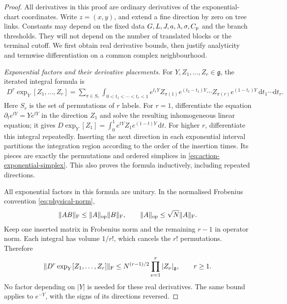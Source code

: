 \documentclass[11pt,reqno]{amsart}
\numberwithin{equation}{section}
\theoremstyle{definition}
\theoremstyle{remark}
\newcommand{\dd}{\mathrm d}
\newcommand{\g}{\mathfrak g}
\begin{document}
\begin{proof}
All derivatives in this proof are ordinary derivatives of the
exponential-chart coordinates. Write \(z=(x,y)\), and extend a
fine direction by zero on tree links. Constants may depend on
the fixed data \(G,L,J,a,\lambda,\sigma,C_{\rm p}\) and the
branch thresholds. They will not depend on the number of
translated blocks or the terminal cutoff. We first obtain real
derivative bounds, then justify analyticity and termwise
differentiation on a common complex neighbourhood.

\smallskip\noindent
\emph{Exponential factors and their derivative placements.}
For \(Y,Z_1,\ldots,Z_r\in\g\), the iterated integral formula is
\begin{equation}
 \begin{split}
 D^r\exp_Y[Z_1,\ldots,Z_r]
  =\sum_{\pi\in S_r}\int_{0<t_1<\cdots<t_r<1}
       e^{t_1Y}Z_{\pi(1)}e^{(t_2-t_1)Y}
          \cdots Z_{\pi(r)}e^{(1-t_r)Y}\,
                                \dd t_1\cdots\dd t_r .
 \end{split}
 \label{eq:action-exponential-simplex}
\end{equation}
Here \(S_r\) is the set of permutations of \(r\) labels.
For \(r=1\), differentiate the equation
\(\partial_t e^{tY}=Ye^{tY}\) in the direction \(Z_1\)
and solve the resulting inhomogeneous linear equation;
it gives \(D\exp_Y[Z_1]=\int_0^1e^{tY}Z_1e^{(1-t)Y}\,\dd t\).
For higher \(r\), differentiate this integral repeatedly.
Inserting the next direction in each exponential interval
partitions the integration region according to the order of
the insertion times. Its pieces are exactly the permutations
and ordered simplices in \eqref{eq:action-exponential-simplex}.
This also proves the formula inductively, including repeated
directions.

All exponential factors in this formula are unitary. In the
normalised Frobenius convention \eqref{eq:physical-norm},
\[
 \|AB\|_{\rm F}\le\|A\|_{\rm op}\|B\|_{\rm F},\qquad
                       \|A\|_{\rm op}\le\sqrt N\|A\|_{\rm F}.
\]
Keep one inserted matrix in Frobenius norm and the remaining
\(r-1\) in operator norm. Each integral has volume \(1/r!\),
which cancels the \(r!\) permutations. Therefore
\begin{equation}
 \|D^r\exp_Y[Z_1,\ldots,Z_r]\|_{\rm F}
       \le N^{(r-1)/2}\prod_{\nu=1}^r|Z_\nu|_{\g},
                                      \qquad r\ge1.
 \label{eq:action-real-exponential-price}
\end{equation}
No factor depending on \(|Y|\) is needed for these real
derivatives. The same bound applies to \(e^{-Y}\), with
the signs of its directions reversed.


\end{proof}
\end{document}
